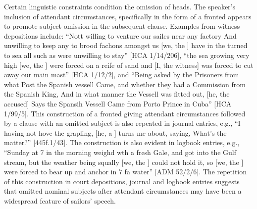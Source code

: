 Certain linguistic constraints condition the omission of  heads. The speaker’s inclusion of attendant circumstances, specifically in the form of a fronted  appears to promote  subject omission in the subsequent clause. Examples from witness depositions include: “Nott willing to venture our sailes near any factory And unwilling to keep any to brood fachons amongst us [we, the ] have in the  turned to sea all such as were unwilling to stay” [HCA 1/14/206], “the sea growing very high [we, the ] were forced on a reife of sand and [I, the witness] was forced to cut away our main mast” [HCA 1/12/2], and “Being asked by the Prisoners from what Post the Spanish vessell Came, and whether they had a Commission from the Spanish King, And in what manner the Vessell was fitted out, [he, the accused] Says the Spansih Vessell Came from Porto Prince in Cuba” [HCA 1/99/5]. This construction of a fronted  giving attendant circumstances followed by a clause with an omitted  subject is also repeated in journal entries, e.g., “I having not hove the grapling, [he, a ] turns me about, saying, What’s the matter?” [445f.1/43]. The construction is also evident in logbook entries, e.g., “Sunday at 7 in the morning weighd wth a fresh Gale, and got into the Gulf stream, but the weather being squally [we, the ] could not hold it, so [we, the ] were forced to bear up and anchor in 7 fa water” [ADM 52/2/6]. The repetition of this construction in court depositions, journal and logbook entries suggests that omitted nominal subjects after attendant circumstances may have been a widespread feature of sailors’ speech. 


